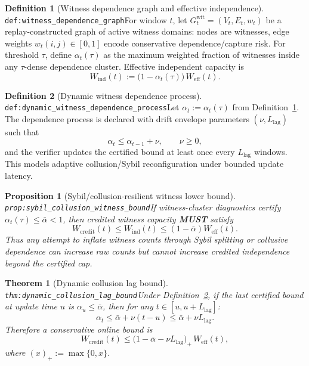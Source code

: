 \documentclass[11pt]{article}
\theoremstyle{definition}
\newtheorem{definition}{Definition}
\theoremstyle{plain}
\newtheorem{proposition}{Proposition}
\newtheorem{theorem}{Theorem}
\newcommand{\MUST}{\textbf{MUST}}
\newcommand{\lbl}[1]{\texttt{\footnotesize\nolinkurl{#1}}}
\newcommand{\DefLabel}[1]{\hfill{\small\lbl{#1}}}
\begin{document}
\begin{definition}[Witness dependence graph and effective independence]\DefLabel{def:witness_dependence_graph}\label{def:witness_dependence_graph}
For window $t$, let $G_t^{\mathrm{wit}}=(V_t,E_t,w_t)$ be a replay-constructed graph of active witness domains:
nodes are witnesses, edge weights $w_t(i,j)\in[0,1]$ encode conservative dependence/capture risk.
For threshold $\tau$, define $\alpha_t(\tau)$ as the maximum weighted fraction of witnesses inside any $\tau$-dense dependence cluster.
Effective independent capacity is
\[
W_{\mathrm{ind}}(t):=\big(1-\alpha_t(\tau)\big)\,W_{\mathrm{eff}}(t).
\]
\end{definition}

\begin{definition}[Dynamic witness dependence process]\DefLabel{def:dynamic_witness_dependence_process}\label{def:dynamic_witness_dependence_process}
Let $\alpha_t:=\alpha_t(\tau)$ from Definition~\ref{def:witness_dependence_graph}.
The dependence process is declared with drift envelope parameters $(\nu,L_{\mathrm{lag}})$ such that
\[
\alpha_t \le \alpha_{t-1}+\nu,\qquad \nu\ge 0,
\]
and the verifier updates the certified bound at least once every $L_{\mathrm{lag}}$ windows.
This models adaptive collusion/Sybil reconfiguration under bounded update latency.
\end{definition}

\begin{proposition}[Sybil/collusion-resilient witness lower bound]\DefLabel{prop:sybil_collusion_witness_bound}\label{prop:sybil_collusion_witness_bound}
If witness-cluster diagnostics certify $\alpha_t(\tau)\le \bar{\alpha}<1$, then credited witness capacity \MUST{} satisfy
\[
W_{\mathrm{credit}}(t)\le W_{\mathrm{ind}}(t)\le (1-\bar{\alpha})W_{\mathrm{eff}}(t).
\]
Thus any attempt to inflate witness counts through Sybil splitting or collusive dependence can increase raw counts but cannot increase credited independence beyond the certified cap.
\end{proposition}

\begin{theorem}[Dynamic collusion lag bound]\DefLabel{thm:dynamic_collusion_lag_bound}\label{thm:dynamic_collusion_lag_bound}
Under Definition~\ref{def:dynamic_witness_dependence_process}, if the last certified bound at update time $u$ is $\alpha_u\le \bar\alpha$, then for any
$t\in[u,u+L_{\mathrm{lag}}]$:
\[
\alpha_t \le \bar\alpha+\nu (t-u)\le \bar\alpha+\nu L_{\mathrm{lag}}.
\]
Therefore a conservative online bound is
\[
W_{\mathrm{credit}}(t)\le \big(1-\bar\alpha-\nu L_{\mathrm{lag}}\big)_+\,W_{\mathrm{eff}}(t),
\]
where $(x)_+:=\max\{0,x\}$.
\end{theorem}
\end{document}
